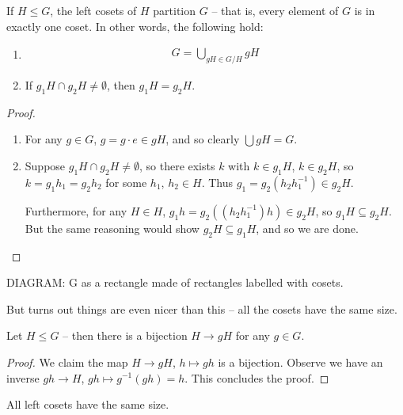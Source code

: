 \documentclass{../../template/note}
\begin{document}
    \begin{lemma}
        If \(H \leq G\), the left cosets of \(H\) partition \(G\) -- that is, every element of \(G\) is in exactly one coset. In other words, the following hold:
        \begin{enumerate}
            \item
            \begin{align*}
                G = \bigcup_{gH \in G/H} gH
            \end{align*}
            \item If \(g_1H \cap g_2H \neq \emptyset\), then \(g_1H = g_2H\). 
        \end{enumerate} 
    \end{lemma}
    
    \begin{proof}
        \begin{enumerate}
            \item For any \(g \in G\), \(g = g \cdot e \in gH\), and so clearly \(\bigcup gH = G\).
            \item Suppose \(g_1H \cap g_2H \neq \emptyset\), so there exists \(k\) with \(k \in g_1H\), \(k \in g_2H\), so \(k = g_1h_1 = g_2h_2\) for some \(h_1\), \(h_2 \in H\). Thus \(g_1 = g_2 (h_2h_1^{-1}) \in g_2H\).
            
            Furthermore, for any \(H \in H\), \(g_1h = g_2((h_2h_1^{-1})h) \in g_2H\), so \(g_1H \subseteq g_2H\). But the same reasoning would show \(g_2H \subseteq g_1H\), and so we are done.
        \end{enumerate}
    \end{proof}
    
    DIAGRAM: G as a rectangle made of rectangles labelled with cosets.

    But turns out things are even nicer than this -- all the cosets have the same size.

    \begin{lemma}
        Let \(H \leq G\) -- then there is a bijection \(H \to gH\) for any \(g \in G\).
    \end{lemma}
    
    \begin{proof}
        We claim the map \(H \to gH\), \(h \mapsto gh\) is a bijection. Observe we have an inverse \(gh \to H\), \(gh \mapsto g^{-1}(gh) = h\). This concludes the proof.
    \end{proof}
    
    \begin{corollary}
        All left cosets have the same size.
    \end{corollary}
\end{document}
